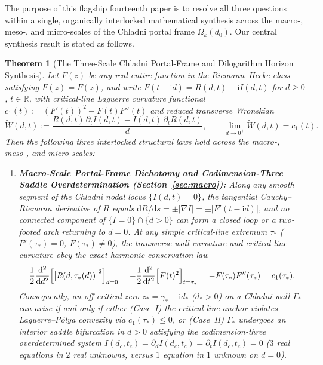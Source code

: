 \documentclass[11pt,reqno]{amsart}
\newtheorem{theorem}{Theorem}[section]
\theoremstyle{definition}
\theoremstyle{remark}
\numberwithin{equation}{section}
\newcommand{\dd}{\mathrm{d}}
\newcommand{\ii}{\mathrm{i}}
\begin{document}
The purpose of this flagship fourteenth paper is to resolve all three questions within a single, organically interlocked mathematical synthesis across the macro-, meso-, and micro-scales of the Chladni portal frame $\Omega_k(d_0)$. Our central synthesis result is stated as follows.

\begin{theorem}[The Three-Scale Chladni Portal-Frame and Dilogarithm Horizon Synthesis]\label{thm:main-synthesis}
Let $F(z)$ be any real-entire function in the Riemann--Hecke class satisfying $F(\bar{z})=\overline{F(z)}$, and write $F(t-\ii d) = R(d,t) + \ii I(d,t)$ for $d \ge 0$, $t \in \mathbb{R}$, with critical-line Laguerre curvature functional $c_1(t) := (F'(t))^2 - F(t)F''(t)$ and reduced transverse Wronskian
\begin{equation}\label{eq:W-tilde-intro}
\widetilde{W}(d,t) := \frac{R(d,t)\,\partial_t I(d,t) - I(d,t)\,\partial_t R(d,t)}{d}, \qquad \lim_{d \to 0^+} \widetilde{W}(d,t) = c_1(t).
\end{equation}
Then the following three interlocked structural laws hold across the macro-, meso-, and micro-scales:
\begin{enumerate}[label=\upshape(\Roman*),leftmargin=2.4em]
\item \textbf{Macro-Scale Portal-Frame Dichotomy and Codimension-Three Saddle Overdetermination (Section~\ref{sec:macro}):} Along any smooth segment of the Chladni nodal locus $\{I(d,t)=0\}$, the tangential Cauchy--Riemann derivative of $R$ equals $\dd R/\dd s = \pm |\nabla I| = \pm |F'(t-\ii d)|$, and no connected component of $\{I=0\} \cap \{d>0\}$ can form a closed loop or a two-footed arch returning to $d=0$. At any simple critical-line extremum $\tau_*$ ($F'(\tau_*)=0$, $F(\tau_*)\ne 0$), the transverse wall curvature and critical-line curvature obey the exact harmonic conservation law
\begin{equation}\label{eq:harmonic-conservation-intro}
\frac{1}{2}\frac{\dd^2}{\dd d^2}\Bigl[\bigl|R(d,\tau_*(d))\bigr|^2\Bigr]_{d=0} = -\frac{1}{2}\frac{\dd^2}{\dd t^2}\Bigl[F(t)^2\Bigr]_{t=\tau_*} = -F(\tau_*)F''(\tau_*) = c_1(\tau_*).
\end{equation}
Consequently, an off-critical zero $z_* = \gamma_* - \ii d_*$ ($d_* > 0$) on a Chladni wall $\Gamma_*$ can arise if and only if either \emph{(Case~I)} the critical-line anchor violates Laguerre--P\'{o}lya convexity via $c_1(\tau_*) \le 0$, or \emph{(Case~II)} $\Gamma_*$ undergoes an interior saddle bifurcation in $d>0$ satisfying the codimension-three overdetermined system $I(d_c,t_c) = \partial_d I(d_c,t_c) = \partial_t I(d_c,t_c) = 0$ ($3$ real equations in $2$ real unknowns, versus $1$ equation in $1$ unknown on $d=0$).

\end{enumerate}
\end{theorem}
\end{document}
